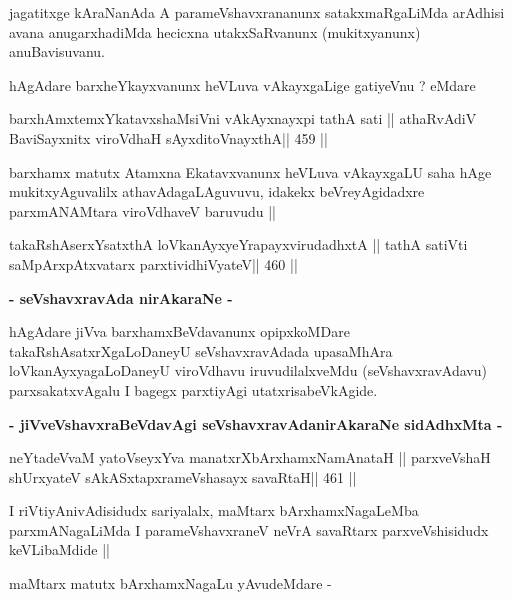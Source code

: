 \begin{artha}
jagatitxge kAraNanAda A parameVshavxrananunx satakxmaRgaLiMda arAdhisi
avana anugarxhadiMda hecicxna utakxSaRvanunx (mukitxyanunx) anuBavisuvanu.
\end{artha}

\begin{artha}
hAgAdare barxheYkayxvanunx heVLuva vAkayxgaLige gatiyeVnu ? eMdare
\end{artha}

\begin{shl}
barxhAmxtemxYkatavxshaMsiVni vAkAyxnayxpi tathA sati ||
athaRvAdiV BaviSayxnitx viroVdhaH sAyxditoV\s nayxthA\hfill || 459 ||
\end{shl}

\begin{artha}
barxhamx matutx Atamxna Ekatavxvanunx heVLuva vAkayxgaLU saha hAge
mukitxyAguvalilx athavAdagaLAguvuvu, idakekx beVreyAgidadxre
parxmANAMtara viroVdhaveV baruvudu ||
\end{artha}

\begin{shl}
takaRshAserxYsatxthA loVkanAyxyeYrapayxvirudadhxtA ||
tathA satiVti saMpArxpAtxvatarx parxtividhiVyateV\hfill || 460 ||
\end{shl}

\medskip
\centerline{\textbf{- seVshavxravAda nirAkaraNe -}}

\begin{artha}
hAgAdare jiVva barxhamxBeVdavanunx opipxkoMDare
takaRshAsatxrXgaLoDaneyU seVshavxravAdada upasaMhAra
loVkanAyxyagaLoDaneyU viroVdhavu iruvudilalxveMdu (seVshavxravAdavu)
parxsakatxvAgalu I bagegx parxtiyAgi utatxrisabeVkAgide.
\end{artha}

\medskip
\centerline{\textbf{- jiVveVshavxraBeVdavAgi seVshavxravAdanirAkaraNe
    sidAdhxMta -}}

\begin{shl}
neYtadeVvaM yatoV\s seyxYva manatxrXbArxhamxNamAnataH ||
parxveVshaH shUrxyateV sAkASxtapxrameVshasayx savaRtaH\hfill || 461 ||
\end{shl}

\begin{artha}
I riVtiyAnivAdisidudx sariyalalx, maMtarx bArxhamxNagaLeMba
parxmANagaLiMda I parameVshavxraneV neVrA savaRtarx parxveVshisidudx
keVLibaMdide ||
\end{artha}

\begin{artha}
maMtarx matutx bArxhamxNagaLu yAvudeMdare -
\end{artha}

